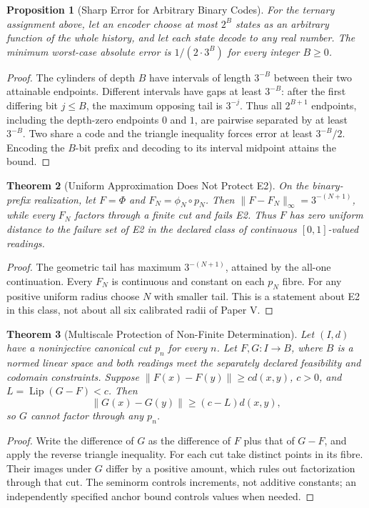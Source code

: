 \documentclass[11pt,a4paper]{article}
\theoremstyle{plain}
\newtheorem{theorem}{Theorem}[section]
\newtheorem{proposition}[theorem]{Proposition}
\theoremstyle{definition}
\theoremstyle{remark}
\begin{document}
\begin{proposition}[Sharp Error for Arbitrary Binary Codes]\label{prop:ternary-arbitrary-code}
For the ternary assignment above, let an encoder choose at most $2^B$ states as an arbitrary function of the whole history, and let each state decode to any real number. The minimum worst-case absolute error is $1/(2\cdot3^B)$ for every integer $B\geq0$.
\end{proposition}
\begin{proof}
The cylinders of depth $B$ have intervals of length $3^{-B}$ between their two attainable endpoints. Different intervals have gaps at least $3^{-B}$: after the first differing bit $j\leq B$, the maximum opposing tail is $3^{-j}$. Thus all $2^{B+1}$ endpoints, including the depth-zero endpoints $0$ and $1$, are pairwise separated by at least $3^{-B}$. Two share a code and the triangle inequality forces error at least $3^{-B}/2$. Encoding the $B$-bit prefix and decoding to its interval midpoint attains the bound.
\end{proof}

\begin{theorem}[Uniform Approximation Does Not Protect E2]\label{thm:uniform-e2-obstruction}
On the binary-prefix realization, let $F=\Phi$ and $F_N=\phi_N\circ p_N$. Then $\|F-F_N\|_\infty=3^{-(N+1)}$, while every $F_N$ factors through a finite cut and fails E2. Thus $F$ has zero uniform distance to the failure set of E2 in the declared class of continuous $[0,1]$-valued readings.
\end{theorem}
\begin{proof}
The geometric tail has maximum $3^{-(N+1)}$, attained by the all-one continuation. Every $F_N$ is continuous and constant on each $p_N$ fibre. For any positive uniform radius choose $N$ with smaller tail. This is a statement about E2 in this class, not about all six calibrated radii of Paper V.
\end{proof}

\begin{theorem}[Multiscale Protection of Non-Finite Determination]\label{thm:multiscale-e2-protection}
Let $(I,d)$ have a noninjective canonical cut $p_n$ for every $n$. Let $F,G:I\to B$, where $B$ is a normed linear space and both readings meet the separately declared feasibility and codomain constraints. Suppose $\|F(x)-F(y)\|\ge c d(x,y)$, $c>0$, and $L=\operatorname{Lip}(G-F)<c$. Then
\[
 \|G(x)-G(y)\|\ge(c-L)d(x,y),
\]
so $G$ cannot factor through any $p_n$.
\end{theorem}
\begin{proof}
Write the difference of $G$ as the difference of $F$ plus that of $G-F$, and apply the reverse triangle inequality. For each cut take distinct points in its fibre. Their images under $G$ differ by a positive amount, which rules out factorization through that cut. The seminorm controls increments, not additive constants; an independently specified anchor bound controls values when needed.
\end{proof}
\end{document}
